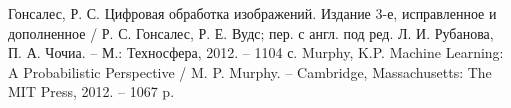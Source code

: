 \documentclass[main.tex]{subfiles}
\begin{document}
	\begin{thebibliography}{99}
		 Гонсалес, Р. С. Цифровая обработка изображений. Издание 3-е, исправленное и дополненное / Р. С. Гонсалес, Р. Е. Вудс; пер. с англ. под ред. Л. И. Рубанова, П. А. Чочиа. -- М.: Техносфера, 2012. -- 1104 с.
		 Murphy, K.P. Machine Learning: A Probabilistic Perspective / M. P. Murphy. -- Cambridge, Massachusetts: The MIT Press, 2012. -- 1067 p.
	\end{thebibliography}
\end{document}
